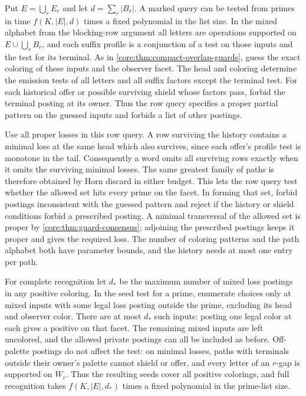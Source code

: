 Put $E=\bigcup_r E_r$ and let $d=\sum_r|B_r|$. A marked query
can be tested from primes in time $f(K,|E|,d)$ times a fixed
polynomial in the list size. In the mixed alphabet from the
blocking-row argument all letters are operations supported on
$E\cup\bigcup_r B_r$, and each suffix profile is a conjunction of
a test on those inputs and the test for its terminal. As in
\cref{core:thm:compact-overlap-guards}, guess the exact coloring
of these inputs and the observer facet. The head and coloring
determine the emission tests of all letters and all suffix
factors except the terminal test. For each historical offer
or possible surviving shield whose factors pass, forbid the
terminal posting at its owner. Thus the row query specifies a
proper partial pattern on the guessed inputs and forbids a
list of other postings.

Use all proper losses in this row query. A row surviving the
history contains a minimal loss at the same head which also
survives, since each offer's profile test is monotone in the
tail. Consequently a word omits all surviving rows exactly when
it omits the surviving minimal losses. The same greatest family
of paths is therefore obtained by Horn discard in either budget.
This lets the row query test whether the allowed set hits every
prime on the facet. In forming that set, forbid postings
inconsistent with the guessed pattern and reject if the history
or shield conditions forbid a prescribed posting. A minimal
transversal of the allowed set is proper by
\cref{core:thm:guard-consensus}; adjoining the prescribed
postings keeps it proper and gives the required loss. The number
of coloring patterns and the path alphabet both have parameter
bounds, and the history needs at most one entry per path.

For complete recognition let $d_*$ be the maximum number of
mixed loss postings in any positive coloring. In the seed test
for a prime, enumerate choices only at mixed inputs with some
legal loss posting outside the prime, excluding its head and
observer color. There are at most $d_*$ such inputs: posting one
legal color at each gives a positive on that facet. The remaining
mixed inputs are left uncolored, and the allowed private postings
can all be included as before. Off-palette postings do not affect
the test: on minimal losses, paths with terminals outside their
owner's palette cannot shield or offer, and every letter of an
$r$-gap is supported on $W_r$. Thus the resulting seeds cover all
positive colorings, and full recognition takes
$f(K,|E|,d_*)$ times a fixed polynomial in the prime-list size.

